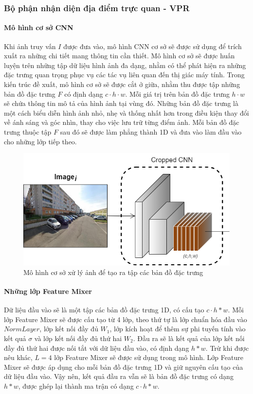 \subsubsection{Bộ phận nhận diện địa điểm trực quan - VPR}
\paragraph*{Mô hình cơ sở CNN}

Khi ảnh truy vấn $I$ được đưa vào, mô hình CNN cơ sở sẽ được sử dụng để trích xuất ra những chi tiết mang thông tin cần thiết. Mô hình cơ sở sẽ được huấn luyện trên những tập dữ liệu hình ảnh đa dạng, nhằm có thể phát hiện ra những đặc trưng quan trọng phục vụ các tác vụ liên quan đến thị giác máy tính. Trong kiến trúc đề xuất, mô hình cơ sở sẽ được cắt ở giữa, nhằm thu được tập những bản đồ đặc trưng $F$ có định dạng $c \cdot h \cdot w$. Mỗi giá trị trên bản đồ đặc trưng $h \cdot w$ sẽ chứa thông tin mô tả của hình ảnh tại vùng đó. Những bản đồ đặc trưng là một cách biểu diễn hình ảnh nhỏ, nhẹ và thống nhất hơn trong điều kiện thay đổi về ánh sáng và góc nhìn, thay cho việc lưu trữ từng điểm ảnh. Mỗi bản đồ đặc trưng thuộc tập $F$ sau đó sẽ được làm phẳng thành 1D và đưa vào làm đầu vào cho những lớp tiếp theo.

\begin{figure}[H]
    \centering
    \includegraphics[scale=0.6]{pics/Proposal/cropped-cnn.png}
    \caption{Mô hình cơ sở xử lý ảnh để tạo ra tập các bản đồ đặc trưng \cite{alibey2023mixvpr}}
\end{figure}

\paragraph*{Những lớp Feature Mixer}

Dữ liệu đầu vào sẽ là một tập các bản đồ đặc trưng 1D, có cấu tạo $c \cdot h*w$. Mỗi lớp Feature Mixer sẽ được cấu tạo từ 4 lớp, theo thứ tự là lớp chuẩn hóa đầu vào $NormLayer$, lớp kết nối đầy đủ $W_1$, lớp kích hoạt để thêm sự phi tuyến tính vào kết quả $\sigma$ và lớp kết nối đầy đủ thứ hai $W_2$. Đầu ra sẽ là kết quả của lớp kết nối đầy đủ thứ hai được nối tắt với dữ liệu đầu vào, có định dạng $h*w$. Trừ khi được nêu khác, $L=4$ lớp Feature Mixer sẽ được sử dụng trong mô hình. Lớp Feature Mixer sẽ được áp dụng cho mỗi bản đồ đặc trưng 1D và giữ nguyên cấu tạo của dữ liệu đầu vào. Vậy nên, kết quả đầu ra vẫn sẽ là bản đồ đặc trưng có dạng $h*w$, được ghép lại thành ma trận có dạng $c \cdot h*w$.


